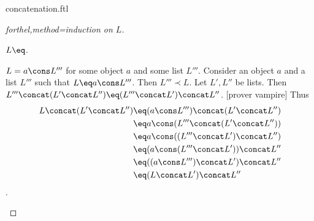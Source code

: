 \documentclass{naproche-library}
\begin{document}
\begin{smodule}[title=Concatenation]{concatenation.ftl}
\begin{proof}[forthel,method=induction on $L$]
  \begin{case}{$L \eq \list{}$.} \end{case}

  \begin{case}{$L = a \cons L'''$ for some object $a$ and some list $L'''$.}
    Consider an object $a$ and a list $L'''$ such that $L \eq a \cons L'''$.
    Then $L''' \prec L$.
    Let $L',L''$ be lists.
    Then $L''' \concat (L' \concat L'') \eq (L''' \concat L') \concat L''$.
    [prover vampire]
    Thus
    \begin{align*}
      L \concat (L' \concat L'') 
        &\eq (a \cons L''') \concat (L' \concat L'')\\
        &\eq a \cons (L''' \concat (L' \concat L''))\\
        &\eq a \cons ((L''' \concat L') \concat L'')\\
        &\eq (a \cons (L''' \concat L')) \concat L''\\
        &\eq ((a \cons L''') \concat L') \concat L''\\
        &\eq (L \concat L') \concat L''
    \end{align*}.
  \end{case}
\end{proof}
\end{smodule}
\end{document}
